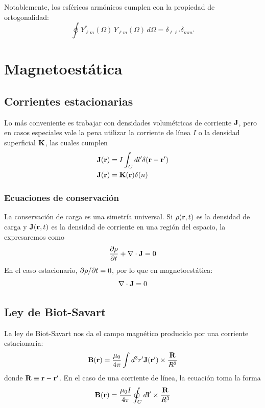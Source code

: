 \documentclass[]{article}
\numberwithin{equation}{section}
\begin{document}
Notablemente, los esféricos armónicos cumplen con la propiedad de ortogonalidad:
\begin{equation}
	\oint Y^{*}_{\ell m}(\Omega) \, Y_{\ell m}(\Omega) \, d\Omega = \delta_{\ell \ell'} \delta_{mm'}\label{YY*_ort}
\end{equation}

\section{Magnetoestática}

\subsection{Corrientes estacionarias}
Lo más conveniente es trabajar con densidades volumétricas de corriente \(\mathbf{J}\), pero en casos especiales vale la pena utilizar la corriente de línea \(I\) o la densidad superficial \(\mathbf{K}\), las cuales cumplen
\begin{align}
	\mathbf{J}(\mathbf{r}) &= I \int_{C} dl' \delta(\mathbf{r} - \mathbf{r}')\\
	\mathbf{J}(\mathbf{r}) &= \mathbf{K}(\mathbf{r}) \delta(n)
\end{align}

\subsubsection{Ecuaciones de conservación}
La conservación de carga es una simetría universal. Si \(\rho(\mathbf{r},t)\) es la densidad de carga y \(\mathbf{J}(\mathbf{r},t)\) es la densidad de corriente en una región del espacio, la expresaremos como
\begin{equation}
	\dfrac{\partial \rho}{\partial t} + \nabla\cdot\mathbf{J} = 0
\end{equation}
En el caso estacionario, \(\partial \rho/\partial t = 0\), por lo que en magnetoestática:
\begin{equation}
	\nabla\cdot\mathbf{J} = 0
\end{equation}

\subsection{Ley de Biot-Savart}
La ley de Biot-Savart nos da el campo magnético producido por una corriente estacionaria:
\begin{equation}
	\mathbf{B}(\mathbf{r}) = \frac{\mu_{0}}{4 \pi} \int d^3 r' \mathbf{J}(\mathbf{r}') \times \frac{\mathbf{R}}{R^3}
\end{equation}
donde \(\mathbf{R} \equiv \mathbf{r} - \mathbf{r}'\). En el caso de una corriente de línea, la ecuación toma la forma
\begin{equation}
	\mathbf{B}(\mathbf{r}) = \frac{\mu_{0} I}{4 \pi} \oint_{C} d\mathbf{l}' \times \frac{\mathbf{R}}{R^3}
\end{equation}
\end{document}
